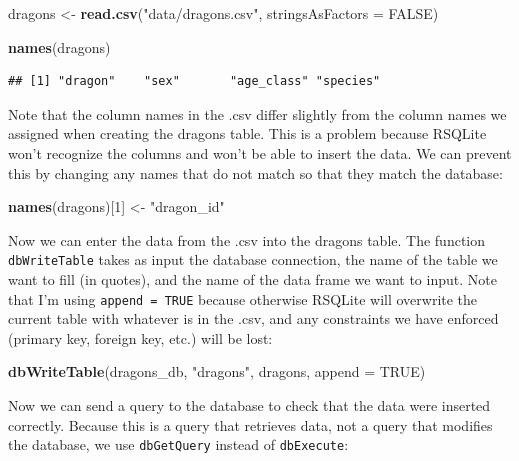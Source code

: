\documentclass[
]{book}
\newenvironment{Shaded}{\begin{snugshade}}{\end{snugshade}}
\newcommand{\AttributeTok}[1]{\textcolor[rgb]{0.13,0.29,0.53}{#1}}
\newcommand{\ConstantTok}[1]{\textcolor[rgb]{0.56,0.35,0.01}{#1}}
\newcommand{\DecValTok}[1]{\textcolor[rgb]{0.00,0.00,0.81}{#1}}
\newcommand{\FunctionTok}[1]{\textcolor[rgb]{0.13,0.29,0.53}{\textbf{#1}}}
\newcommand{\NormalTok}[1]{#1}
\newcommand{\OtherTok}[1]{\textcolor[rgb]{0.56,0.35,0.01}{#1}}
\newcommand{\StringTok}[1]{\textcolor[rgb]{0.31,0.60,0.02}{#1}}
\begin{document}
\begin{Shaded}
\begin{Highlighting}[]
\NormalTok{dragons }\OtherTok{\textless{}{-}} \FunctionTok{read.csv}\NormalTok{(}\StringTok{"data/dragons.csv"}\NormalTok{, }
                   \AttributeTok{stringsAsFactors =} \ConstantTok{FALSE}\NormalTok{) }

\FunctionTok{names}\NormalTok{(dragons)}
\end{Highlighting}
\end{Shaded}

\begin{verbatim}
## [1] "dragon"    "sex"       "age_class" "species"
\end{verbatim}

Note that the column names in the .csv differ slightly from the column names we
assigned when creating the dragons table. This is a problem because RSQLite
won't recognize the columns and won't be able to insert the data. We can prevent
this by changing any names that do not match so that they match the database:

\begin{Shaded}
\begin{Highlighting}[]
\FunctionTok{names}\NormalTok{(dragons)[}\DecValTok{1}\NormalTok{] }\OtherTok{\textless{}{-}} \StringTok{"dragon\_id"}
\end{Highlighting}
\end{Shaded}

Now we can enter the data from the .csv into the dragons table. The function
\texttt{dbWriteTable} takes as input the database connection, the name of the table we
want to fill (in quotes), and the name of the data frame we want to input. Note
that I'm using \texttt{append\ =\ TRUE} because otherwise RSQLite will overwrite the
current table with whatever is in the .csv, and any constraints we have enforced (primary key, foreign key, etc.) will be lost:

\begin{Shaded}
\begin{Highlighting}[]
\FunctionTok{dbWriteTable}\NormalTok{(dragons\_db, }\StringTok{"dragons"}\NormalTok{, dragons, }\AttributeTok{append =} \ConstantTok{TRUE}\NormalTok{)}
\end{Highlighting}
\end{Shaded}

Now we can send a query to the database to check that the data were inserted
correctly. Because this is a query that retrieves data, not a query that
modifies the database, we use \texttt{dbGetQuery} instead of \texttt{dbExecute}:
\end{document}
